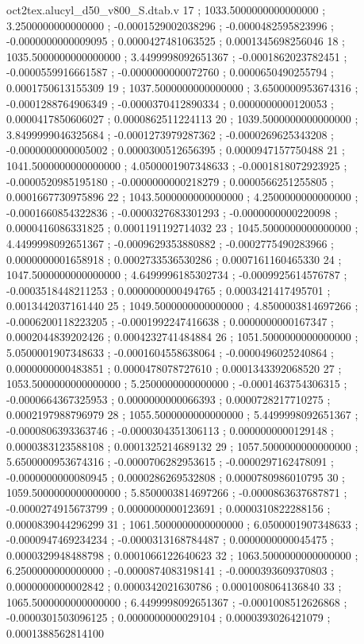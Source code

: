 \begin{filecontents}[overwrite]{oct2tex.alucyl_d50_v800_S.dtab.v}
17 ; 1033.5000000000000000 ; 3.2500000000000000 ; -0.0001529002038296 ; -0.0000482595823996 ; -0.0000000000009095 ; 0.0000427481063525 ; 0.0001345698256046
18 ; 1035.5000000000000000 ; 3.4499998092651367 ; -0.0001862023782451 ; -0.0000559916661587 ; -0.0000000000072760 ; 0.0000650490255794 ; 0.0001750613155309
19 ; 1037.5000000000000000 ; 3.6500000953674316 ; -0.0001288764906349 ; -0.0000370412890334 ; 0.0000000000120053 ; 0.0000417850606027 ; 0.0000862511224113
20 ; 1039.5000000000000000 ; 3.8499999046325684 ; -0.0001273979287362 ; -0.0000269625343208 ; -0.0000000000005002 ; 0.0000300512656395 ; 0.0000947157750488
21 ; 1041.5000000000000000 ; 4.0500001907348633 ; -0.0001818072923925 ; -0.0000520985195180 ; -0.0000000000218279 ; 0.0000566251255805 ; 0.0001667730975896
22 ; 1043.5000000000000000 ; 4.2500000000000000 ; -0.0001660854322836 ; -0.0000327683301293 ; -0.0000000000220098 ; 0.0000416086331825 ; 0.0001191192714032
23 ; 1045.5000000000000000 ; 4.4499998092651367 ; -0.0009629353880882 ; -0.0002775490283966 ; 0.0000000001658918 ; 0.0002733536530286 ; 0.0007161160465330
24 ; 1047.5000000000000000 ; 4.6499996185302734 ; -0.0009925614576787 ; -0.0003518448211253 ; 0.0000000000494765 ; 0.0003421417495701 ; 0.0013442037161440
25 ; 1049.5000000000000000 ; 4.8500003814697266 ; -0.0006200118223205 ; -0.0001992247416638 ; 0.0000000000167347 ; 0.0002044839202426 ; 0.0004232741484884
26 ; 1051.5000000000000000 ; 5.0500001907348633 ; -0.0001604558638064 ; -0.0000496025240864 ; 0.0000000000483851 ; 0.0000478078727610 ; 0.0001343392068520
27 ; 1053.5000000000000000 ; 5.2500000000000000 ; -0.0001463754306315 ; -0.0000664367325953 ; 0.0000000000066393 ; 0.0000728217710275 ; 0.0002197988796979
28 ; 1055.5000000000000000 ; 5.4499998092651367 ; -0.0000806393363746 ; -0.0000304351306113 ; 0.0000000000129148 ; 0.0000383123588108 ; 0.0001325214689132
29 ; 1057.5000000000000000 ; 5.6500000953674316 ; -0.0000706282953615 ; -0.0000297162478091 ; -0.0000000000080945 ; 0.0000286269532808 ; 0.0000780986010795
30 ; 1059.5000000000000000 ; 5.8500003814697266 ; -0.0000863637687871 ; -0.0000274915673799 ; 0.0000000000123691 ; 0.0000310822288156 ; 0.0000839044296299
31 ; 1061.5000000000000000 ; 6.0500001907348633 ; -0.0000947469234234 ; -0.0000313168784487 ; 0.0000000000045475 ; 0.0000329948488798 ; 0.0001066122640623
32 ; 1063.5000000000000000 ; 6.2500000000000000 ; -0.0000874083198141 ; -0.0000393609370803 ; 0.0000000000002842 ; 0.0000342021630786 ; 0.0001008064136840
33 ; 1065.5000000000000000 ; 6.4499998092651367 ; -0.0001008512626868 ; -0.0000301503096125 ; 0.0000000000029104 ; 0.0000393026421079 ; 0.0001388562814100

\end{filecontents}

